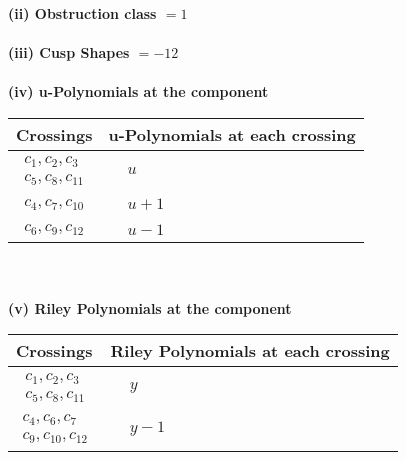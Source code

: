 \documentclass[1p]{elsarticle_modified}
\theoremstyle{definition}
\begin{document}
\flushleft \textbf{(ii) Obstruction class $= 1$}\\~\\
\flushleft \textbf{(iii) Cusp Shapes $= -12$}\\~\\
\newpage\renewcommand{\arraystretch}{1}
\flushleft \textbf{(iv) u-Polynomials at the component}\newline \\
\begin{tabular}{m{50pt}|m{274pt}}
Crossings & \hspace{64pt}u-Polynomials at each crossing \\
\hline $$\begin{aligned}c_{1},c_{2},c_{3}\\c_{5},c_{8},c_{11}\end{aligned}$$&$\begin{aligned}
&u
\end{aligned}$\\
\hline $$\begin{aligned}c_{4},c_{7},c_{10}\end{aligned}$$&$\begin{aligned}
&u+1
\end{aligned}$\\
\hline $$\begin{aligned}c_{6},c_{9},c_{12}\end{aligned}$$&$\begin{aligned}
&u-1
\end{aligned}$\\
\hline
\end{tabular}\\~\\
\newpage\renewcommand{\arraystretch}{1}
\flushleft \textbf{(v) Riley Polynomials at the component}\newline \\
\begin{tabular}{m{50pt}|m{274pt}}
Crossings & \hspace{64pt}Riley Polynomials at each crossing \\
\hline $$\begin{aligned}c_{1},c_{2},c_{3}\\c_{5},c_{8},c_{11}\end{aligned}$$&$\begin{aligned}
&y
\end{aligned}$\\
\hline $$\begin{aligned}c_{4},c_{6},c_{7}\\c_{9},c_{10},c_{12}\end{aligned}$$&$\begin{aligned}
&y-1
\end{aligned}$\\
\hline
\end{tabular}\\~\\
\end{document}
